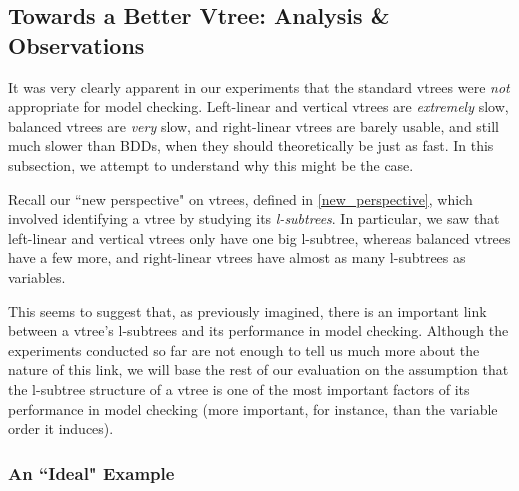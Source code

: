 \documentclass[11pt]{report}
\begin{document}
\subsection{Towards a Better Vtree: Analysis \& Observations}
\label{analysis_example}

It was very clearly apparent in our experiments that the standard vtrees were \textit{not} appropriate for model checking. Left-linear and vertical vtrees are \textit{extremely} slow, balanced vtrees are \textit{very} slow, and right-linear vtrees are barely usable, and still much slower than BDDs, when they should theoretically be just as fast. In this subsection, we attempt to understand why this might be the case. 

Recall our ``new perspective" on vtrees, defined in \ref{new_perspective}, which involved identifying a vtree by studying its \textit{l-subtrees}. In particular, we saw that left-linear and vertical vtrees only have one big l-subtree, whereas balanced vtrees have a few more, and right-linear vtrees have almost as many l-subtrees as variables.

This seems to suggest that, as previously imagined, there is an important link between a vtree's l-subtrees and its performance in model checking. Although the experiments conducted so far are not enough to tell us much more about the nature of this link, we will base the rest of our evaluation on the assumption that the l-subtree structure of a vtree is one of the most important factors of its performance in model checking (more important, for instance, than the variable order it induces). 

\subsubsection{An ``Ideal" Example}
\end{document}
